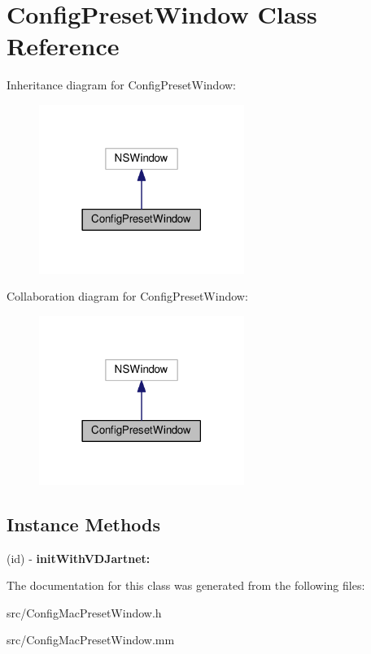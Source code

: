 \hypertarget{interfaceConfigPresetWindow}{}\section{Config\+Preset\+Window Class Reference}
\label{interfaceConfigPresetWindow}


Inheritance diagram for Config\+Preset\+Window\+:
\nopagebreak
\begin{figure}[H]
\begin{center}
\leavevmode
\includegraphics[width=189pt]{interfaceConfigPresetWindow__inherit__graph}
\end{center}
\end{figure}


Collaboration diagram for Config\+Preset\+Window\+:
\nopagebreak
\begin{figure}[H]
\begin{center}
\leavevmode
\includegraphics[width=189pt]{interfaceConfigPresetWindow__coll__graph}
\end{center}
\end{figure}
\subsection*{Instance Methods}
\begin{DoxyCompactItemize}
\item 
\mbox{\label{interfaceConfigPresetWindow_ad103b27046e919b6721f1407ca513e72}} 
(id) -\/ {\bfseries init\+With\+V\+D\+Jartnet\+:}
\end{DoxyCompactItemize}


The documentation for this class was generated from the following files\+:\begin{DoxyCompactItemize}
\item 
src/Config\+Mac\+Preset\+Window.\+h\item 
src/Config\+Mac\+Preset\+Window.\+mm\end{DoxyCompactItemize}
